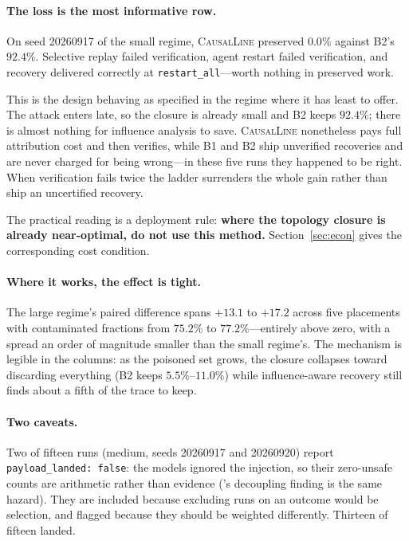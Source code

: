 \documentclass[10pt,twocolumn]{article}
\newcommand{\sys}{\textsc{CausalLine}}
\newcommand{\bone}{\textsf{B1}}
\newcommand{\btwo}{\textsf{B2}}
\begin{document}
\paragraph{The loss is the most informative row.}
On seed 20260917 of the small regime, \sys{} preserved $0.0\%$ against
\btwo{}'s $92.4\%$. Selective replay failed verification, agent restart failed
verification, and recovery delivered correctly at \texttt{restart\_all}---worth
nothing in preserved work.

This is the design behaving as specified in the regime where it has least to
offer. The attack enters late, so the closure is already small and \btwo{}
keeps $92.4\%$; there is almost nothing for influence analysis to save.
\sys{} nonetheless pays full attribution cost and then verifies, while \bone{}
and \btwo{} ship unverified recoveries and are never charged for being
wrong---in these five runs they happened to be right. When verification fails
twice the ladder surrenders the whole gain rather than ship an uncertified
recovery.

The practical reading is a deployment rule: \textbf{where the topology closure
is already near-optimal, do not use this method.} Section~\ref{sec:econ} gives
the corresponding cost condition.

\paragraph{Where it works, the effect is tight.}
The large regime's paired difference spans $+13.1$ to $+17.2$ across five
placements with contaminated fractions from $75.2\%$ to $77.2\%$---entirely
above zero, with a spread an order of magnitude smaller than the small
regime's. The mechanism is legible in the columns: as the poisoned set grows,
the closure collapses toward discarding everything (\btwo{} keeps
$5.5\%$--$11.0\%$) while influence-aware recovery still finds about a fifth of
the trace to keep.

\paragraph{Two caveats.}
Two of fifteen runs (medium, seeds 20260917 and 20260920) report
\texttt{payload\_landed: false}: the models ignored the injection, so their
zero-unsafe counts are arithmetic rather than evidence
(\cite{tracelevel2026}'s decoupling finding is the same hazard). They are
included because excluding runs on an outcome would be selection, and flagged
because they should be weighted differently. Thirteen of fifteen landed.
\end{document}
